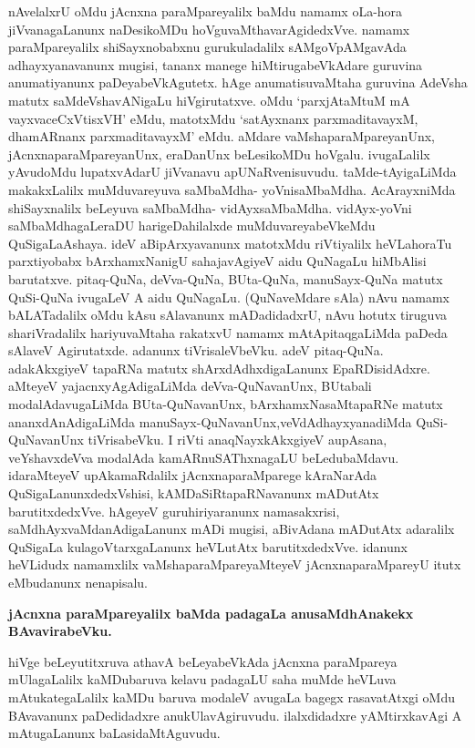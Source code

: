 \noindent
nAvelalxrU oMdu jAcnxna paraMpareyalilx baMdu namamx oLa-hora jiVvanagaLanunx naDesikoMDu hoVguvaMthavarAgidedxVve. namamx paraMpareyalilx shiSayx\-nobabxnu guru\-kuladalilx sAMgoVpAMgavAda adhayx\-yanavanunx mugisi, tananx manege hiMtiruga\-beVkAdare guruvina anumatiyanunx paDeyabeVkAgutetx. hAge anumatisu\-vaMtaha guruvina AdeVsha matutx saMdeVshavANigaLu hiVgirutatxve. oMdu `parxjAtaMtuM mA\- vayxvaceCxVtisxVH'\label{139} eMdu, matotxMdu `satAyxnanx parxmaditavayxM, dhamARnanx parxmaditavayxM' eMdu. aMdare vaMsha\-paraMpareyanUnx, jAcnxnaparaMpareyanUnx, eraDanUnx beLesi\-koMDu hoVgalu. ivu\-gaLalilx yAvudoM\-du lupatxvAdarU jiVvanavu apUNaRvenisuvudu. taMde-tAyigaLiMda makakxLalilx muMdu\-vare\-yuva saMbaMdha- yoVni\-saMbaMdha. AcArayxniMda shiSayxnalilx beLeyuva saMbaMdha- vidAyxsaMbaMdha. vidAyx-\break\-yoVni saMbaMdhagaLeraDU harigeDahilalxde muMduvareyabeVkeMdu QuSigaLa\break Ashaya. ideV aBi\-pArxya\-vanunx matotxMdu riVtiyalilx heVLahoraTu parxti\-yobabx bArxhamxNanigU sahajavAgiyeV aidu QuNagaLu hiMbAlisi barutatxve. pitaq-QuNa, deVva-QuNa, BUta-QuNa, manuSayx-QuNa matutx QuSi-QuNa ivugaLeV A aidu QuNa\-gaLu. (QuNaveMdare sAla) nAvu namamx bALATadalilx oMdu kAsu sAlavanunx mADa\-didadxrU, nAvu hotutx tiruguva shariVradalilx hariyuvaMtaha rakatxvU \hbox{namamx} mAtApitaqgaLiMda paDeda sAlaveV Agirutatxde. adanunx tiVrisaleVbeVku. adeV pitaq-QuNa. adakAkxgiyeV tapaRNa matutx shArxdAdhxdi\-gaLanunx EpaRDisidAdxre. aMteyeV yajacnxyAgAdigaLiMda deVva-QuNavanUnx, BUtabali modalAdavu\-gaLiMda BUta-\-QuNavanUnx, bArxhamxNasaMtapaRNe matutx ananxdAnAdigaLiMda manuSayx-QuNavanUnx,\break veVdA\-dhayxyanadiMda QuSi-QuNavanUnx tiVrisabeVku. I riVti anaqNayxkAkxgiyeV aupA\-sana, veYshavxdeVva moda\-lAda kamARnuSAThxnagaLU beLedubaMdavu. idaraMteyeV upAkamaRdalilx jAcnxnaparaMparege kAraNa\-rAda QuSigaLanunxdedxVshisi, kAMDaSiR\break\-tapaRNavanunx mADutAtx barutitxdedxVve. hAgeyeV guruhiriyaranunx namasakxrisi, saMdhAyx\-vaMdanAdigaLanunx mADi mugisi, aBivAdana mADutAtx adaralilx QuSi\-gaLa kulagoVtarx\-gaLanunx heVLutAtx barutitxdedxVve. idanunx heVLidudx namamxlilx vaMshaparaM\-pareyaMteyeV jAcnxnaparaMpareyU itutx eMbudanunx nenapisalu.

{\bigskip
\noindent
{\large\bf jAcnxna paraMpareyalilx baMda padagaLa anusaMdhAnakekx BAvavirabeVku.}}\label{page140}
\medskip

\noindent
hiVge beLeyutitxruva athavA beLeyabeVkAda jAcnxna paraMpareya mUlagaLalilx kaMDubaruva kelavu padagaLU saha muMde heVLuva mAtukategaLalilx kaMDu baruva modaleV avugaLa bagegx rasavatAtxgi oMdu BAvavanunx paDedidadxre anukUlavAgiruvudu. ilalxdidadxre yAMtirxkavAgi A mAtugaLanunx baLasi\-daMtA\-gu\-vudu.

